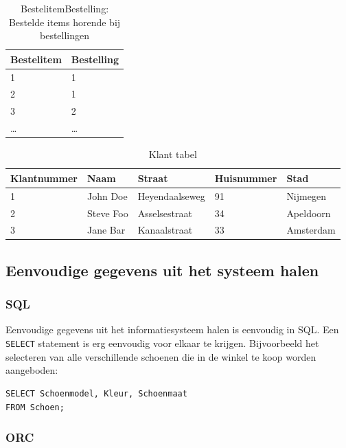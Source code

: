 \documentclass{article}
\begin{document}
\begin{table}[hp]
  \centering
  \begin{tabular}{l|l}
    \textbf{Bestelitem} & \textbf{Bestelling}\\ 
    \hline
    1      & 1      \\
    2      & 1      \\
    3      & 2      \\
    \ldots & \ldots \\
  \end{tabular}
  \caption{BestelitemBestelling: Bestelde items horende bij bestellingen}
  \label{tab:bestelitembestelling}
\end{table}

\begin{table}[hp]
  \centering
  \begin{tabular}{l|l|l|l|l}
    \textbf{Klantnummer} & \textbf{Naam} & \textbf{Straat} & \textbf{Huisnummer} & \textbf{Stad} \\
    \hline
    1 & John Doe & Heyendaalseweg & 91 & Nijmegen \\
    2 & Steve Foo & Asselsestraat & 34 & Apeldoorn \\
    3 & Jane Bar  & Kanaalstraat  & 33 & Amsterdam \\
  \end{tabular}
  \caption{Klant tabel}
  \label{tab:klant}
\end{table}

\FloatBarrier
\subsection{Eenvoudige gegevens uit het systeem halen}

\subsubsection{SQL}

Eenvoudige gegevens uit het informatiesysteem halen is eenvoudig in SQL. Een
\verb+SELECT+ statement is erg eenvoudig voor elkaar te krijgen. Bijvoorbeeld
het selecteren van alle verschillende schoenen die in de winkel te koop worden
aangeboden:

\begin{verbatim}
SELECT Schoenmodel, Kleur, Schoenmaat 
FROM Schoen;
\end{verbatim}

\subsubsection{ORC}
\end{document}
